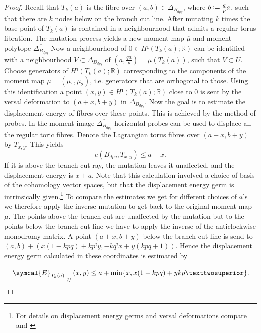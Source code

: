 \documentclass[12pt,a4paper,draft]{scrartcl}
\begin{document}
\begin{proof}
  Recall that $T_k(a)$ is the fibre over $(a,b) \in Δ_{B_{dpq}}$, where $b\vcentcolon=\frac{q}{p}a$, such that there are $k$ nodes below on the branch cut line.
  After mutating $k$ times the base point of $T_k(a)$ is contained in a neighbourhood that admits a regular torus fibration.
  The mutation process yields a new moment map $\overline{μ}$ and moment polytope $\overline{Δ_{B_{dpq}}}$
   Now a neighbourhood of $0 ∈ H¹(T_k(a);ℝ)$ can be identified with a neighbourhood $V ⊂ \overline{Δ_{B_{dpq}}}$ of $(a,\frac{qa}{p}) = μ(T_k(a))$, such that $V \subset U$.
  Choose generators of $H¹(T_k(a);ℝ)$ corresponding to the components of the moment map $\overline{\mu}=(\overline{\mu_1},\overline{\mu_2})$, i.e.
  generators that are orthogonal to those.
  Using this identification a point $(x,y) ∈ H¹(T_k(a);ℝ)$ close to $0$ is sent by the versal deformation to $(a + x, b + y)$ in $\overline{Δ_{B_{dpq}}}$.
  Now the goal is to estimate the displacement energy of fibres over these points.
  This is achieved by the method of probes.
  In the moment image $\overline{Δ_{B_{dpq}}}$ horizontal probes can be used to displace all the regular toric fibres.
  Denote the Lagrangian torus fibres over $(a + x, b + y)$ by $T_{x,y}$.
  This yields 
  \[ e(B_{dpq},T_{x,y})\leq a+x. \]
  If it is above the branch cut ray,  the mutation leaves it unaffected, and the displacement energy is $x+a$.
  Note that this calculation involved a choice of basis of the cohomology vector spaces, but that the displacement energy germ is intrinsically given.\footnote{For details on displacement energy germs and versal deformations compare \cite{chekanovschlenk2015} and \cite{brendel2020real}} To compare the estimates we get for different choices of $a$'s we therefore apply the inverse mutation to get back to the original moment map $\mu$.
  The points above the branch cut are unaffected by the mutation but to the points below the branch cut line we have to apply the inverse of the anticlockwise monodromy matrix.
   A point $(a + x, b + y)$ below the branch cut line is send to $(a,b) + (x(1-kpq)+kp²y, -kq²x + y(kpq +1))$.
  Hence the displacement energy germ calculated in these coordinates is estimated by 
  \[ \eval{\symcal{E}_{T_k(a)}}_U (x,y) \leq a+\min\{x,x(1-kpq)+ykp²\}. \]
\end{proof}

\begin{theorem}
  \label{thm:upper_bound_embedded}
\end{theorem}
\end{document}
